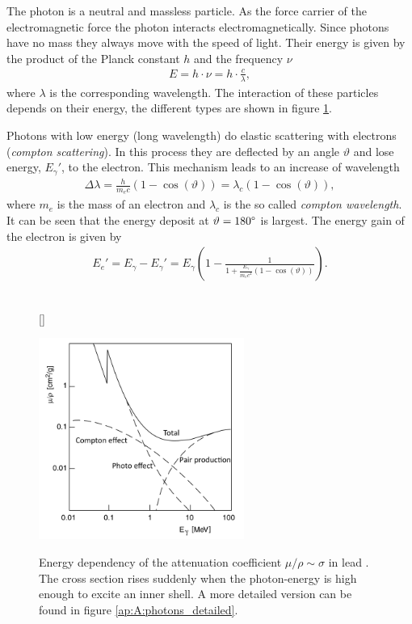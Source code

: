 The photon is a neutral and massless particle. As the force carrier of the electromagnetic force the photon interacts electromagnetically. Since photons have no mass they always move with the speed of light. Their energy is given by the product of the Planck constant $h$ and the frequency $\nu$
\begin{align}
E=h\cdot\nu=h\cdot\frac{c}{\lambda},
\end{align}
where $\lambda$ is the corresponding wavelength. The interaction of these particles depends on their energy, the different types are shown in figure \ref{fig:ch1:photons}.\par 
Photons with low energy (long wavelength) do elastic scattering with electrons (\textit{compton scattering}). In this process they are deflected by an angle $\vartheta$ and lose energy, $E_{\gamma}'$, to the electron. This mechanism leads to an increase of wavelength 
\begin{align}
\Delta\lambda=\frac{h}{m_ec}\left(1-\cos(\vartheta)\right)=\lambda_c\left(1-\cos(\vartheta)\right) \label{eq:compton_wavelength},
\end{align}
where $m_e$ is the mass of an electron and $\lambda_c$ is the so called \textit{compton wavelength}. It can be seen that the energy deposit at $\vartheta=180\degree$ is largest. The energy gain of the electron is given by 
\begin{align}
E_e'=E_\gamma-E_\gamma'=E_\gamma\left(1-\frac{1}{1+\frac{E_\gamma}{m_ec^2}\left(1-\cos(\vartheta)\right)}
\right).
\end{align} \\[0.5cm] 
\par 
\begin{figure}[t]
	[\FBwidth]
	{\caption[Interaction of phtonos with matter]{Energy dependency of the attenuation coefficient $\mu/\rho\sim\sigma$ in lead \cite{povh}. The cross section rises suddenly when the photon-energy is high enough to excite an inner shell. A more detailed version can be found in figure \ref{ap:A:photons_detailed}.}    
	\label{fig:ch1:photons}}
	{\includegraphics[width=0.6\textwidth]{./graphics/ch1/photo_absorption.png}}
\end{figure}
